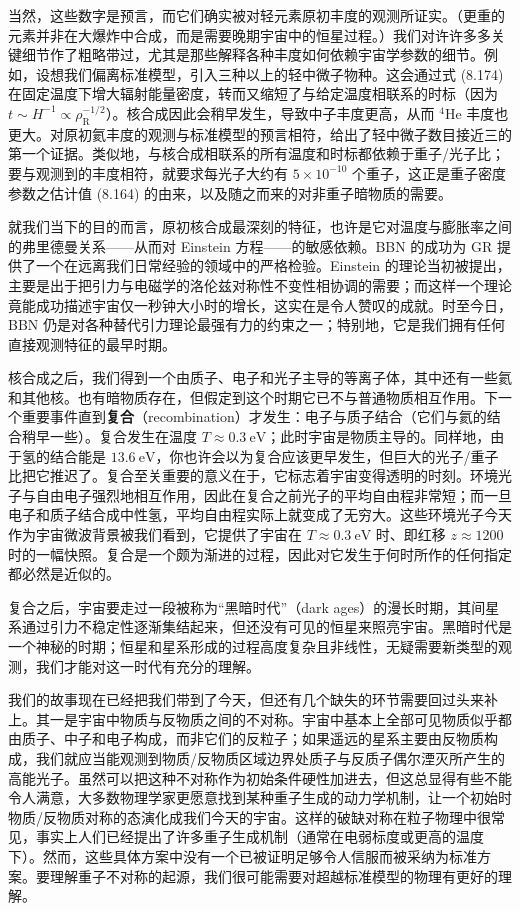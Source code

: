 当然，这些数字是预言，而它们确实被对轻元素原初丰度的观测所证实。（更重的元素并非在大爆炸中合成，而是需要晚期宇宙中的恒星过程。）我们对许许多多关键细节作了粗略带过，尤其是那些解释各种丰度如何依赖宇宙学参数的细节。例如，设想我们偏离标准模型，引入三种以上的轻中微子物种。这会通过式 (8.174) 在固定温度下增大辐射能量密度，转而又缩短了与给定温度相联系的时标（因为 $t\sim H^{-1}\propto\rho_{\mathrm{R}}^{-1/2}$）。核合成因此会稍早发生，导致中子丰度更高，从而 $^{4}\mathrm{He}$ 丰度也更大。对原初氦丰度的观测与标准模型的预言相符，给出了轻中微子数目接近三的第一个证据。类似地，与核合成相联系的所有温度和时标都依赖于重子/光子比；要与观测到的丰度相符，就要求每光子大约有 $5\times 10^{-10}$ 个重子，这正是重子密度参数之估计值 (8.164) 的由来，以及随之而来的对非重子暗物质的需要。

就我们当下的目的而言，原初核合成最深刻的特征，也许是它对温度与膨胀率之间的弗里德曼关系——从而对 Einstein 方程——的敏感依赖。BBN 的成功为 GR 提供了一个在远离我们日常经验的领域中的严格检验。Einstein 的理论当初被提出，主要是出于把引力与电磁学的洛伦兹对称性不变性相协调的需要；而这样一个理论竟能成功描述宇宙仅一秒钟大小时的增长，这实在是令人赞叹的成就。时至今日，BBN 仍是对各种替代引力理论最强有力的约束之一；特别地，它是我们拥有任何直接观测特征的最早时期。

核合成之后，我们得到一个由质子、电子和光子主导的等离子体，其中还有一些氦和其他核。也有暗物质存在，但假定到这个时期它已不与普通物质相互作用。下一个重要事件直到\textbf{复合}（recombination）才发生：电子与质子结合（它们与氦的结合稍早一些）。复合发生在温度 $T\approx 0.3~\mathrm{eV}$；此时宇宙是物质主导的。同样地，由于氢的结合能是 $13.6~\mathrm{eV}$，你也许会以为复合应该更早发生，但巨大的光子/重子比把它推迟了。复合至关重要的意义在于，它标志着宇宙变得透明的时刻。环境光子与自由电子强烈地相互作用，因此在复合之前光子的平均自由程非常短；而一旦电子和质子结合成中性氢，平均自由程实际上就变成了无穷大。这些环境光子今天作为宇宙微波背景被我们看到，它提供了宇宙在 $T\approx 0.3~\mathrm{eV}$ 时、即红移 $z\approx 1200$ 时的一幅快照。复合是一个颇为渐进的过程，因此对它发生于何时所作的任何指定都必然是近似的。

复合之后，宇宙要走过一段被称为“黑暗时代”（dark ages）的漫长时期，其间星系通过引力不稳定性逐渐集结起来，但还没有可见的恒星来照亮宇宙。黑暗时代是一个神秘的时期；恒星和星系形成的过程高度复杂且非线性，无疑需要新类型的观测，我们才能对这一时代有充分的理解。

我们的故事现在已经把我们带到了今天，但还有几个缺失的环节需要回过头来补上。其一是宇宙中物质与反物质之间的不对称。宇宙中基本上全部可见物质似乎都由质子、中子和电子构成，而非它们的反粒子；如果遥远的星系主要由反物质构成，我们就应当能观测到物质/反物质区域边界处质子与反质子偶尔湮灭所产生的高能光子。虽然可以把这种不对称作为初始条件硬性加进去，但这总显得有些不能令人满意，大多数物理学家更愿意找到某种重子生成的动力学机制，让一个初始时物质/反物质对称的态演化成我们今天的宇宙。这样的破缺对称在粒子物理中很常见，事实上人们已经提出了许多重子生成机制（通常在电弱标度或更高的温度下）。然而，这些具体方案中没有一个已被证明足够令人信服而被采纳为标准方案。要理解重子不对称的起源，我们很可能需要对超越标准模型的物理有更好的理解。

